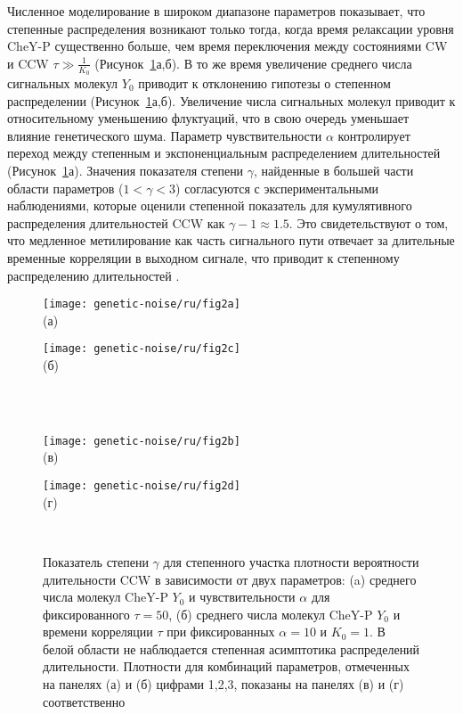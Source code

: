 Численное моделирование в широком диапазоне параметров показывает, что степенные распределения возникают только тогда, когда время релаксации уровня CheY-P существенно больше, чем время переключения между состояниями CW и CCW $\tau \gg \frac{1}{K_0}$ (Рисунок~\cref{fig:pdf-gamma-grid-1}а,б). В то же время увеличение среднего числа сигнальных молекул $Y_0$ приводит к отклонению гипотезы о степенном распределении (Рисунок~\cref{fig:pdf-gamma-grid-1}а,б). Увеличение числа сигнальных молекул приводит к относительному уменьшению флуктуаций, что в свою очередь уменьшает влияние генетического шума. Параметр чувствительности $\alpha$ контролирует переход между степенным и экспоненциальным распределением длительностей (Рисунок~\cref{fig:pdf-gamma-grid-1}а). Значения показателя степени $\gamma$, найденные в большей части области параметров ($1 < \gamma < 3$) согласуются с экспериментальными наблюдениями, которые оценили степенной показатель для кумулятивного распределения длительностей CCW как $\gamma - 1 \approx 1.5$. Это свидетельствуют о том, что медленное метилирование как часть сигнального пути отвечает за длительные временные корреляции в выходном сигнале, что приводит к степенному распределению длительностей \cite{korobkova_molecular_2004}. 


\begin{figure}[!ht]
    \begin{minipage}[b][][b]{0.45\linewidth}\centering
        \texttt{[image: genetic-noise/ru/fig2a]} \\ (а)
    \end{minipage}
    \hfill
    \begin{minipage}[b][][b]{0.45\linewidth}\centering
        \texttt{[image: genetic-noise/ru/fig2c]} \\ (б)
    \end{minipage}\\ \\
    \begin{minipage}[b][][b]{0.45\linewidth}\centering
        \texttt{[image: genetic-noise/ru/fig2b]} \\ (в)
    \end{minipage}
    \hfill
    \begin{minipage}[b][][b]{0.45\linewidth}\centering
        \texttt{[image: genetic-noise/ru/fig2d]} \\ (г)
    \end{minipage} \\
    \caption{
        Показатель степени $\gamma$ для степенного участка плотности вероятности длительности CCW в зависимости от двух параметров: (a) среднего числа молекул CheY-P $Y_0$ и чувствительности $\alpha$ для фиксированного $\tau = 50$, (б) среднего числа молекул CheY-P $Y_0$ и времени корреляции $\tau$ при фиксированных $\alpha = 10$ и $K_0 = 1$. В белой области не наблюдается степенная асимптотика распределений длительности. Плотности для комбинаций параметров, отмеченных на панелях (а) и (б) цифрами 1,2,3, показаны на панелях (в) и (г) соответственно
    }\label{fig:pdf-gamma-grid-1}
\end{figure}

